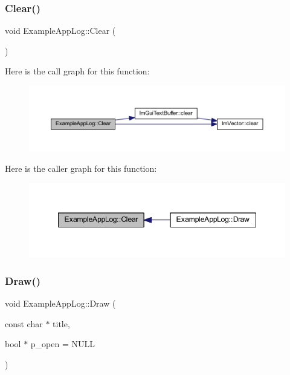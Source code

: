 \subsubsection{\texorpdfstring{Clear()}{Clear()}}
{\footnotesize\ttfamily void Example\+App\+Log\+::\+Clear (\begin{DoxyParamCaption}{ }\end{DoxyParamCaption})\hspace{0.3cm}{\ttfamily [inline]}}

Here is the call graph for this function\+:
\nopagebreak
\begin{figure}[H]
\begin{center}
\leavevmode
\includegraphics[width=350pt]{struct_example_app_log_ab9c298defddbb106fdfe4ab16c5eebac_cgraph}
\end{center}
\end{figure}
Here is the caller graph for this function\+:
\nopagebreak
\begin{figure}[H]
\begin{center}
\leavevmode
\includegraphics[width=348pt]{struct_example_app_log_ab9c298defddbb106fdfe4ab16c5eebac_icgraph}
\end{center}
\end{figure}
\mbox{\label{struct_example_app_log_a5ad3a4bdb89171b84aeaff96948a1f77}} 
\subsubsection{\texorpdfstring{Draw()}{Draw()}}
{\footnotesize\ttfamily void Example\+App\+Log\+::\+Draw (\begin{DoxyParamCaption}\item[{const char $\ast$}]{title,  }\item[{bool $\ast$}]{p\+\_\+open = {\ttfamily NULL} }\end{DoxyParamCaption})\hspace{0.3cm}{\ttfamily [inline]}}

